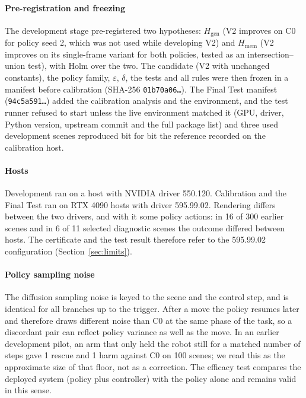 \paragraph{Pre-registration and freezing} The development stage pre-registered two hypotheses: $H_{\mathrm{gen}}$ (V2 improves on C0 for policy seed 2, which was not used while developing V2) and $H_{\mathrm{mem}}$ (V2 improves on its single-frame variant for both policies, tested as an intersection--union test), with Holm over the two. The candidate (V2 with unchanged constants), the policy family, $\varepsilon$, $\delta$, the tests and all rules were then frozen in a manifest before calibration (SHA-256 \texttt{01b70a06\ldots}). The Final Test manifest (\texttt{94c5a591\ldots}) added the calibration analysis and the environment, and the test runner refused to start unless the live environment matched it (GPU, driver, Python version, upstream commit and the full package list) and three used development scenes reproduced bit for bit the reference recorded on the calibration host.

\paragraph{Hosts} Development ran on a host with NVIDIA driver 550.120. Calibration and the Final Test ran on RTX 4090 hosts with driver 595.99.02. Rendering differs between the two drivers, and with it some policy actions: in 16 of 300 earlier scenes and in 6 of 11 selected diagnostic scenes the outcome differed between hosts. The certificate and the test result therefore refer to the 595.99.02 configuration (Section~\ref{sec:limits}).

\paragraph{Policy sampling noise} The diffusion sampling noise is keyed to the scene and the control step, and is identical for all branches up to the trigger. After a move the policy resumes later and therefore draws different noise than C0 at the same phase of the task, so a discordant pair can reflect policy variance as well as the move. In an earlier development pilot, an arm that only held the robot still for a matched number of steps gave 1 rescue and 1 harm against C0 on 100 scenes; we read this as the approximate size of that floor, not as a correction. The efficacy test compares the deployed system (policy plus controller) with the policy alone and remains valid in this sense.

